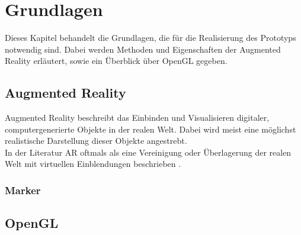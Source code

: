 \chapter{Grundlagen}\label{chapter:Grundlagen}
Dieses Kapitel behandelt die Grundlagen, die für die Realisierung des Prototyps notwendig sind. Dabei werden Methoden und Eigenschaften der Augmented Reality erläutert, sowie ein Überblick über OpenGL gegeben.

\section{Augmented Reality}\label{AR}
Augmented Reality  beschreibt das Einbinden und Visualisieren digitaler, computergenerierte Objekte in der realen Welt. Dabei wird meist  eine möglichst realistische Darstellung dieser Objekte angestrebt.\\
In der Literatur AR oftmals als eine Vereinigung oder Überlagerung der realen Welt mit virtuellen Einblendungen beschrieben \citep{}.


 
\subsection{Marker}

\section{OpenGL}\label{OpenGL}
